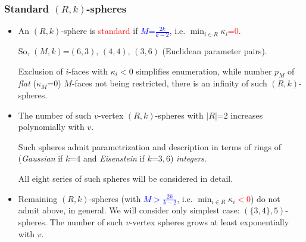 \documentclass{beamer}
\begin{document}
\begin{frame}\frametitle{Standard $(R,k)$-spheres}

\begin{itemize}

\item An $(R,k)$-sphere is \textcolor{red}{standard} 
if \textcolor{blue}{$M$=$\frac{2k}{k-2}$}, i.e. $\min_{i\in 
R}\kappa_i$\textcolor{red}{=$0$}.  

So, 
$(M,k)$=$(6,3),\,(4,4),\,(3,6)$ (Euclidean parameter pairs).

Exclusion
of
$i$-faces with $\kappa_i$$<$$0$ simplifies enumeration, while
 number $p_M$
of {\em flat} ($\kappa_M$=$0$) $M$-faces not being
restricted, there is an infinity of such $(R,k)$-spheres.
 

\item The number of such $v$-vertex $(R,k)$-spheres with 
$|R|$=$2$ increases polynomially with $v$.

Such spheres admit parametrization and description in terms of 
rings of ({\em Gaussian}
if $k$=$4$ and {\em Eisenstein} if $k$=$3,6$) {\em integers}.

All eight series of such spheres will be considered in detail.

\item Remaining $(R,k)$-spheres (with 
\textcolor{blue}{$M$$>$$\frac{2k}{k-2}$}, i.e. $\min_{i\in 
R}\kappa_i$\textcolor{red}{$<0$}) do not 
admit above, in 
general. We will consider only simplest case: 
$(\{3,4\},5)$-spheres.
The number of such $v$-vertex  spheres  
grows 
at least exponentially with $v$.
 

\end{itemize}\end{frame}
\end{document}
